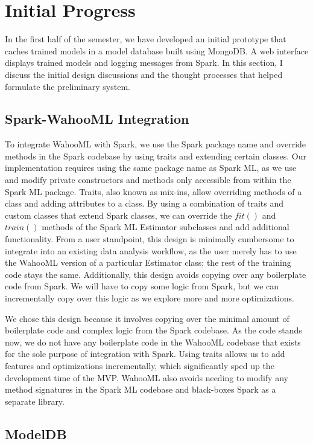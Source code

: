 \documentclass[../proposal.tex]{subfiles}
\begin{document}
\section{Initial Progress}

In the first half of the semester, we have developed an initial prototype that
caches trained models in a model database built using MongoDB. A web interface
displays trained models and logging messages from Spark. In this section, I
discuss the initial design discussions and the thought processes that helped
formulate the preliminary system.

\subsection{Spark-WahooML Integration}

To integrate WahooML with Spark, we use the Spark package name and override
methods in the Spark codebase by using traits and extending certain classes.
Our implementation requires using the same package name as Spark ML, as we use
and modify private constructors and methods only accessible from within the
Spark ML package. Traits, also known as mix-ins, allow overriding methods of a
class and adding attributes to a class. By using a combination of traits and
custom classes that extend Spark classes, we can override the $fit()$ and
$train()$ methods of the Spark ML Estimator subclasses and add additional
functionality.  From a user standpoint, this design is minimally cumbersome to
integrate into an existing data analysis workflow, as the user merely has to
use the WahooML version of a particular Estimator class; the rest of the
training code stays the same. Additionally, this design avoids copying over any
boilerplate code from Spark. We will have to copy some logic from Spark, but we
can incrementally copy over this logic as we explore more and more
optimizations.

We chose this design because it involves copying over the minimal amount of
boilerplate code and complex logic from the Spark codebase. As the code stands
now, we do not have any boilerplate code in the WahooML codebase that exists
for the sole purpose of integration with Spark. Using traits allows us to add
features and optimizations incrementally, which significantly sped up the
development time of the MVP. WahooML also avoids needing to modify any method
signatures in the Spark ML codebase and black-boxes Spark as a separate library.

\subsection{ModelDB}
\end{document}

